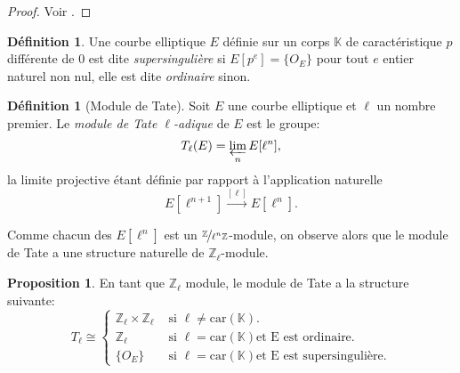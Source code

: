 \documentclass[10pt,a4paper]{book}
\theoremstyle{plain}
\theoremstyle{definition}
\theoremstyle{definition}
\theoremstyle{definition}
\newtheorem{prop}[thm]{Proposition}
\theoremstyle{definition}
\newtheorem{defi}[thm]{Définition}
\theoremstyle{remark}
\theoremstyle{remark}
\begin{document}
\begin{proof}
Voir \cite[Corrolary III.6.4]{Silv1}.
\end{proof}

\begin{defi}
Une courbe elliptique $E$ définie sur un corps $\mathbb{K}$ de caractéristique $p$ différente de $0$ est dite \emph{supersingulière} si $E[p^e]=\{O_E\}$ pour tout $e$ entier naturel non nul, elle est dite \emph{ordinaire} sinon. 
\end{defi}

\begin{defi}[Module de Tate]
Soit $E$ une courbe elliptique et $\ell$ un nombre premier. Le \emph{module de Tate $\ell$-adique} de $E$ est le groupe:
\begin{equation*}
T_{\ell}(E)=\varprojlim_nE[\ell^n],
\end{equation*}
la limite projective étant définie par rapport à l'application naturelle
\begin{equation*}
E[\ell^{n+1}] \overset{[\ell]}{\rightarrow} E[\ell^n].
\end{equation*}
\end{defi}
Comme chacun des $E[\ell^n]$ est un $\nicefrac{\mathbb{Z}}{\ell^n\mathbb{Z}}$-module, on observe alors que le module de Tate a une structure naturelle de $\mathbb{Z}_{\ell}$-module.
\begin{prop}
En tant que $\mathbb{Z}_{\ell}$ module, le module de Tate a la structure suivante:
\begin{equation*}
T_{\ell} \cong 
\begin{cases} 
\mathbb{Z}_{\ell} \times \mathbb{Z}_{\ell} &\text{ si } \ell \neq \mathrm{car}(\mathbb{K}). \\
\mathbb{Z}_{\ell} &\text{ si } \ell=\mathrm{car}(\mathbb{K})  \text{et E est ordinaire}. \\
\{O_E\} &\text{ si } \ell=\mathrm{car}(\mathbb{K})  \text{et E est supersingulière}.
\end{cases}
\end{equation*}
\end{prop}

\end{document}
